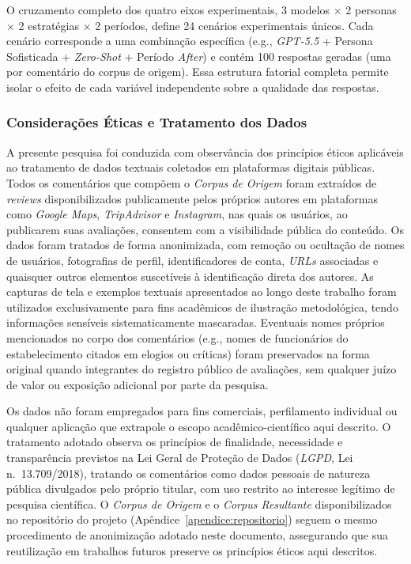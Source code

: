 \documentclass[12pt, a4paper]{article}
\numberwithin{equation}{section}
\begin{document}
O cruzamento completo dos quatro eixos experimentais, 3 modelos $\times$ 2 personas 
$\times$ 2 estratégias $\times$ 2 períodos, define 24 cenários experimentais 
únicos. Cada cenário corresponde a uma combinação específica (e.g., \textit{GPT-5.5} + Persona 
Sofisticada + \textit{Zero-Shot} + Período \textit{After}) e contém 100 respostas geradas 
(uma por comentário do corpus de origem). Essa estrutura fatorial completa permite isolar 
o efeito de cada variável independente sobre a qualidade das respostas.

\subsubsection{Considerações Éticas e Tratamento dos Dados}
\label{subsec:consideracoes_eticas}
A presente pesquisa foi conduzida com observância dos princípios éticos aplicáveis ao tratamento de dados textuais coletados em plataformas digitais públicas. Todos os comentários que compõem o \textit{Corpus de Origem} foram extraídos de \textit{reviews} disponibilizados publicamente pelos próprios autores em plataformas como \textit{Google Maps}, \textit{TripAdvisor} e \textit{Instagram}, nas quais os usuários, ao publicarem suas avaliações, consentem com a visibilidade pública do conteúdo.
Os dados foram tratados de forma anonimizada, com remoção ou ocultação de nomes de usuários, fotografias de perfil, identificadores de conta, \textit{URLs} associadas e quaisquer outros elementos suscetíveis à identificação direta dos autores. As capturas de tela e exemplos textuais apresentados ao longo deste trabalho foram utilizados exclusivamente para fins acadêmicos de ilustração metodológica, tendo informações sensíveis sistematicamente mascaradas. Eventuais nomes próprios mencionados no corpo dos comentários (e.g., nomes de funcionários do estabelecimento citados em elogios ou críticas) foram preservados na forma original quando integrantes do registro público de avaliações, sem qualquer juízo de valor ou exposição adicional por parte da pesquisa.

Os dados não foram empregados para fins comerciais, perfilamento individual ou qualquer aplicação que extrapole o escopo acadêmico-científico aqui descrito. O tratamento adotado observa os princípios de finalidade, necessidade e transparência previstos na Lei Geral de Proteção de Dados (\textit{LGPD}, Lei n.\ 13.709/2018), tratando os comentários como dados pessoais de natureza pública divulgados pelo próprio titular, com uso restrito ao interesse legítimo de pesquisa científica. O \textit{Corpus de Origem} e o \textit{Corpus Resultante} disponibilizados no repositório do projeto (Apêndice~\ref{apendice:repositorio}) seguem o mesmo procedimento de anonimização adotado neste documento, assegurando que sua reutilização em trabalhos futuros preserve os princípios éticos aqui descritos.
\end{document}
